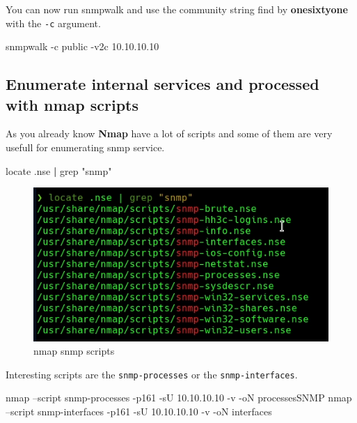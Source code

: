 \documentclass{assets/ipesethesis}
\newenvironment{Shaded}{\begin{snugshade}}{\end{snugshade}}
\newcommand{\ExtensionTok}[1]{#1}
\newcommand{\FunctionTok}[1]{\textcolor[rgb]{0.00,0.00,0.00}{#1}}
\newcommand{\KeywordTok}[1]{\textcolor[rgb]{0.13,0.29,0.53}{\textbf{#1}}}
\newcommand{\NormalTok}[1]{#1}
\newcommand{\StringTok}[1]{\textcolor[rgb]{0.31,0.60,0.02}{#1}}
\begin{document}
You can now run snmpwalk and use the community string find by \textbf{onesixtyone} with the \texttt{-c} argument.

\begin{Shaded}
\begin{Highlighting}[]
\ExtensionTok{snmpwalk}\NormalTok{ -c public -v2c 10.10.10.10}
\end{Highlighting}
\end{Shaded}

\hypertarget{enumerate-internal-services-and-processed-with-nmap-scripts}{%
\subsection*{Enumerate internal services and processed with nmap scripts}\label{enumerate-internal-services-and-processed-with-nmap-scripts}}

As you already know \textbf{Nmap} have a lot of scripts and some of them are very usefull for enumerating snmp service.

\begin{Shaded}
\begin{Highlighting}[]
\FunctionTok{locate}\NormalTok{ .nse }\KeywordTok{|} \FunctionTok{grep} \StringTok{"snmp"}
\end{Highlighting}
\end{Shaded}

\begin{figure}
\includegraphics[width=0.9\linewidth]{images/nmap-snmp-scripts} \caption{nmap snmp scripts}\label{fig:unnamed-chunk-2}
\end{figure}

Interesting scripts are the \texttt{snmp-processes} or the \texttt{snmp-interfaces}.

\begin{Shaded}
\begin{Highlighting}[]
\FunctionTok{nmap}\NormalTok{ --script snmp-processes -p161 -sU 10.10.10.10 -v -oN processesSNMP}
\FunctionTok{nmap}\NormalTok{ --script snmp-interfaces -p161 -sU 10.10.10.10 -v -oN interfaces}
\end{Highlighting}
\end{Shaded}
\end{document}
